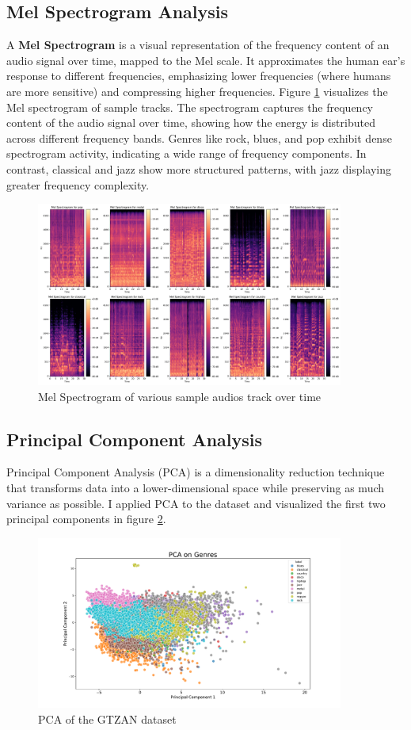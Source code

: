 \documentclass[11.5pt]{article}
\begin{document}
\subsection{Mel Spectrogram Analysis}
A \textbf{Mel Spectrogram} is a visual representation of the frequency content of an audio signal over time, mapped to the Mel scale. It approximates the human ear's response to different frequencies, emphasizing lower frequencies (where humans are more sensitive) and compressing higher frequencies. Figure \ref{fig:spectrogram} visualizes the Mel spectrogram of sample tracks. The spectrogram captures the frequency content of the audio signal over time, showing how the energy is distributed across different frequency bands. Genres like rock, blues, and pop exhibit dense spectrogram activity, indicating a wide range of frequency components. In contrast, classical and jazz show more structured patterns, with jazz displaying greater frequency complexity.
\begin{figure}[h]
    \centering
    \includegraphics[width=0.9\textwidth]{graphics/mel.pdf}
    \caption{Mel Spectrogram of various sample audios track over time}
    \label{fig:spectrogram}
\end{figure}

\subsection{Principal Component Analysis}
Principal Component Analysis (PCA) is a dimensionality reduction technique that transforms data into a lower-dimensional space while preserving as much variance as possible. I applied PCA to the dataset and visualized the first two principal components in figure \ref{fig:pca}.
\begin{figure}[H]
    \centering
    \includegraphics[width=0.9\textwidth]{graphics/pca.pdf}
    \caption{PCA of the GTZAN dataset}
    \label{fig:pca}
\end{figure}
\end{document}
